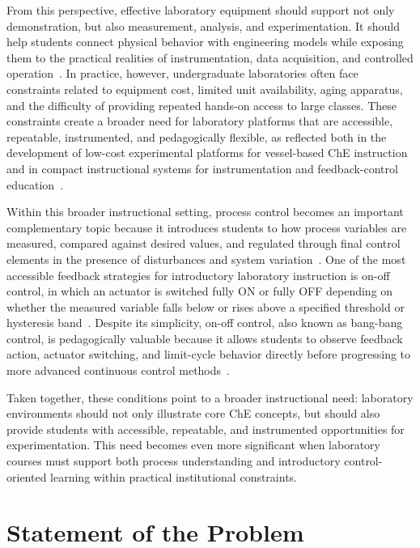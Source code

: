 From this perspective, effective laboratory equipment should support not only demonstration, but also measurement, analysis, and experimentation. It should help students connect physical behavior with engineering models while exposing them to the practical realities of instrumentation, data acquisition, and controlled operation~\citep{saco2002,uyanik2018}. In practice, however, undergraduate laboratories often face constraints related to equipment cost, limited unit availability, aging apparatus, and the difficulty of providing repeated hands-on access to large classes. These constraints create a broader need for laboratory platforms that are accessible, repeatable, instrumented, and pedagogically flexible, as reflected both in the development of low-cost experimental platforms for vessel-based ChE instruction~\citep{nassar2011,ganley2015} and in compact instructional systems for instrumentation and feedback-control education~\citep{plett2023,rehg1998fie}.

Within this broader instructional setting, process control becomes an important complementary topic because it introduces students to how process variables are measured, compared against desired values, and regulated through final control elements in the presence of disturbances and system variation~\citep{seborg2017,ogata2010}. One of the most accessible feedback strategies for introductory laboratory instruction is on-off control, in which an actuator is switched fully ON or fully OFF depending on whether the measured variable falls below or rises above a specified threshold or hysteresis band~\citep{ogata2010,nise2020}. Despite its simplicity, on-off control, also known as bang-bang control, is pedagogically valuable because it allows students to observe feedback action, actuator switching, and limit-cycle behavior directly before progressing to more advanced continuous control methods~\citep{uyanik2018,astrom1985}.

Taken together, these conditions point to a broader instructional need: laboratory environments should not only illustrate core ChE concepts, but should also provide students with accessible, repeatable, and instrumented opportunities for experimentation. This need becomes even more significant when laboratory courses must support both process understanding and introductory control-oriented learning within practical institutional constraints.


\section{Statement of the Problem} %
\label{sec:problem}

